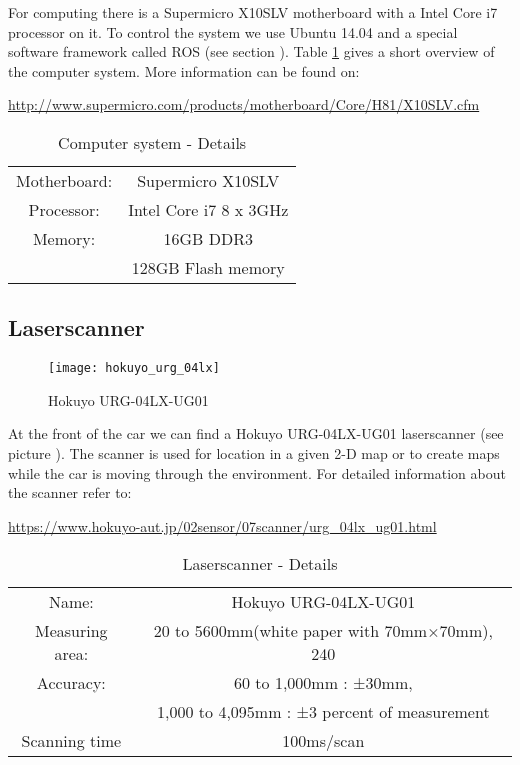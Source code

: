 For computing there is a Supermicro X10SLV motherboard with a Intel Core i7 processor on it. To control the system we use Ubuntu 14.04 and a special software framework called ROS (see section ). Table \ref{tab:computer_details} gives a short overview of the computer system. More information can be found on:

\hyperref[http://www.supermicro.com/products/motherboard/Core/H81/X10SLV.cfm]{http://www.supermicro.com/products/motherboard/Core/H81/X10SLV.cfm}

\begin{table}[h]
	\centering	
	\begin{tabular}{cc} %
		\hline 
		Motherboard: & Supermicro X10SLV \\
		Processor: & Intel Core i7 8 x 3GHz \\
		Memory: & 16GB DDR3 \\
						& 128GB Flash memory \\
		\hline
	\end{tabular}
	\caption{Computer system - Details} %
	\label{tab:computer_details}
\end{table}

\newpage
\subsection{Laserscanner}
\label{sec:overview_laserscanner}

\begin{figure}[h]
	\centering
		\texttt{[image: hokuyo\_urg\_04lx]}
	\caption{Hokuyo URG-04LX-UG01}
	\label{fig:hokuyo}
\end{figure}

At the front of the car we can find a Hokuyo URG-04LX-UG01 laserscanner (see picture ). The scanner is used for location in a given 2-D map or to create maps while the car is moving through the environment. For detailed information about the scanner refer to:

\hyperref[https://www.hokuyo-aut.jp/02sensor/07scanner/urg_04lx_ug01.html]{https://www.hokuyo-aut.jp/02sensor/07scanner/urg\_04lx\_ug01.html}

\begin{table}[h]
	\centering	
	\begin{tabular}{cc} %
		\hline 
		Name: & Hokuyo URG-04LX-UG01 \\
		Measuring area: & 20 to 5600mm(white paper with 70mm×70mm), 240\textdegree \\
		Accuracy: & 60 to 1,000mm : ±30mm, \\
							&	1,000 to 4,095mm : ±3 percent of measurement \\
		Scanning time & 100ms/scan \\
		\hline
	\end{tabular}
	\caption{Laserscanner - Details} %
	\label{tab:laser_details}
\end{table}



